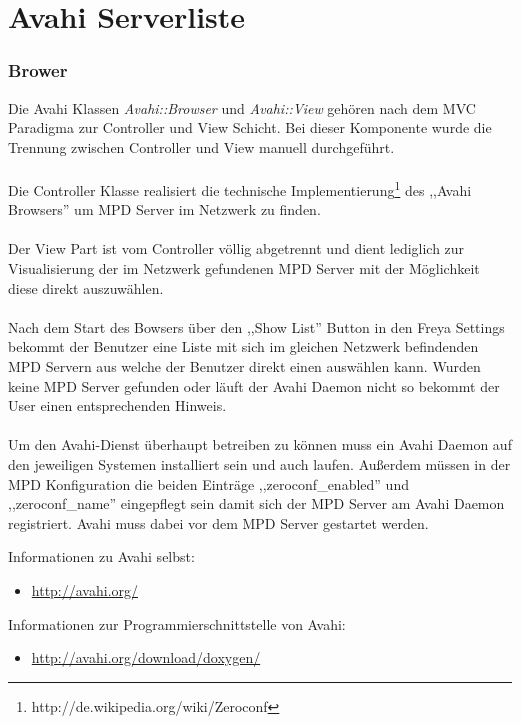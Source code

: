 \section{Avahi Serverliste}
\subsubsection{Brower}

Die Avahi Klassen \emph{Avahi::Browser} und \emph{Avahi::View} gehören nach dem MVC Paradigma zur Controller und View Schicht. Bei
dieser Komponente wurde die Trennung zwischen Controller und View manuell durchgeführt.
\\
\\
Die Controller Klasse realisiert die technische Implementierung\footnote{http://de.wikipedia.org/wiki/Zeroconf} des ,,Avahi Browsers'' um MPD Server im Netzwerk zu finden.
\\
\\
Der View Part ist vom Controller völlig abgetrennt und dient lediglich zur Visualisierung der im Netzwerk gefundenen
MPD Server mit der Möglichkeit diese direkt auszuwählen.
\\
\\
Nach dem Start des Bowsers über den ,,Show List'' Button in den Freya Settings bekommt der Benutzer eine Liste mit sich im
gleichen Netzwerk befindenden MPD Servern aus welche der Benutzer direkt einen auswählen kann. Wurden keine MPD Server
gefunden oder läuft der Avahi Daemon nicht so bekommt der User einen entsprechenden Hinweis.
\\
\\
Um den Avahi-Dienst überhaupt betreiben zu können muss ein Avahi Daemon auf den jeweiligen
Systemen installiert sein und auch laufen. Außerdem müssen in der MPD Konfiguration die beiden Einträge ,,zeroconf\_enabled'' und ,,zeroconf\_name''
eingepflegt sein damit sich der MPD Server am Avahi Daemon registriert. Avahi muss dabei vor dem MPD Server gestartet werden.

Informationen zu Avahi selbst:
\begin{itemize}
\item \url{http://avahi.org/}
\end{itemize}

Informationen zur Programmierschnittstelle von Avahi:
\begin{itemize}
\item \url{http://avahi.org/download/doxygen/}
\end{itemize}

